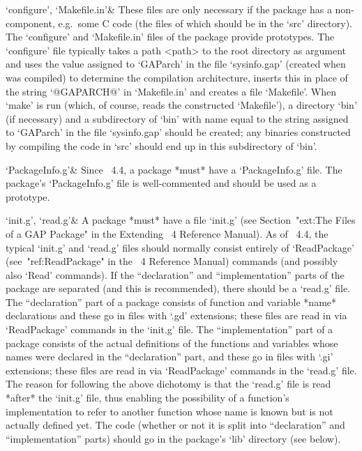 `configure', `Makefile.in'&
These files are only necessary if the package has a non-{\GAP} component,
e.g.~some C code (the files of which should be in the  `src'  directory).
The `configure' and `Makefile.in' files of the {\Example} package provide
prototypes. The `configure' file typically takes a  path  <path>  to  the
{\GAP} root  directory  as  argument  and  uses  the  value  assigned  to
`GAParch' in the file `sysinfo.gap' (created when {\GAP} was compiled) to
determine the compilation architecture, inserts  this  in  place  of  the
string `@GAPARCH@' in `Makefile.in' and creates a file  `Makefile'.  When
`make' is run (which, of course, reads  the  constructed  `Makefile'),  a
directory `bin' (if necessary) and a  subdirectory  of  `bin'  with  name
equal to the string assigned  to  `GAParch'  in  the  file  `sysinfo.gap'
should be created; any binaries constructed  by  compiling  the  code  in
`src' should end up in this subdirectory of `bin'.

`PackageInfo.g'&
Since {\GAP}~4.4, a {\GAP} package *must* have  a  `PackageInfo.g'  file.
The {\Example}  package's  `PackageInfo.g'  file  is  well-commented  and
should be used as a prototype.

`init.g', `read.g'&
A {\GAP} package *must* have a file `init.g' (see Section~"ext:The  Files
of a GAP Package" in the Extending  {\GAP}~4  Reference  Manual).  As  of
{\GAP}~4.4, the typical  `init.g'  and  `read.g'  files  should  normally
consist entirely of `ReadPackage' (see~"ref:ReadPackage" in the  {\GAP}~4
Reference Manual) commands (and possibly also `Read'  commands).  If  the
``declaration'' and ``implementation'' parts of the package are separated
(and  this  is  recommended),  there  should  be  a  `read.g'  file.  The
``declaration'' part of a  package  consists  of  function  and  variable
*name* declarations and these go in files with  `.gd'  extensions;  these
files are read in via `ReadPackage' commands in the  `init.g'  file.  The
``implementation'' part of a package consists of the  actual  definitions
of  the  functions  and  variables  whose  names  were  declared  in  the
``declaration'' part, and these go in files with `.gi' extensions;  these
files are read in via `ReadPackage' commands in the  `read.g'  file.  The
reason for following the above dichotomy is that  the  `read.g'  file  is
read *after* the `init.g'  file,  thus  enabling  the  possibility  of  a
function's implementation to refer to  another  function  whose  name  is
known but is not actually defined yet. The {\GAP} code (whether or not it
is split into ``declaration'' and ``implementation'' parts) should go  in
the package's `lib' directory (see below).

